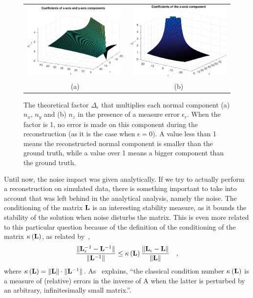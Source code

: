 \documentclass{report}
\begin{document}
\begin{figure}
  \centering
  \begin{tabular}{cc}
  \includegraphics[width=0.45\linewidth]{q3_analytic_nx_ny.pdf} &
  \includegraphics[width=0.45\linewidth]{q3_analytic_nz.pdf} \\
  (a) & (b)
  \end{tabular}
  \caption[Analytical normal component coefficients]
   {The theoretical factor $\Delta_\epsilon$ that multiplies each normal component (a) $n_x$, $n_y$ and (b) $n_z$ in the presence of a measure error $\epsilon_r$. When the factor is 1, no error is made on this component during the reconstruction (as it is the case when $\epsilon = 0$). A value less than 1 means the reconstructed normal component is smaller than the ground truth, while a value over 1 means a bigger component than the ground truth.}
  \label{q3:analytical}
\end{figure}

Until now, the noise impact was given analytically. If we try to actually perform a reconstruction on simulated data, there is something important to take into account that was left behind in the analytical analysis, namely the noise. The conditioning of the matrix $\mathbf{L}$ is an interesting stability measure, as it bounds the stability of the solution when noise disturbs the matrix. This is even more related to this particular question because of the definition of the conditioning of the matrix $\kappa \left(\mathbf{L}\right)$, as related by~\cite{ElGhaoui2002},
\begin{equation}
\frac{ \| \mathbf{L}_\epsilon ^{-1} - \mathbf{L}^{-1} \| }{ \| \mathbf{L}^{-1} \| }
\le \kappa\left(\mathbf{L} \right) \frac{ \| \mathbf{L}_\epsilon - \mathbf{L}  \| }{ \| \mathbf{L} \| }
\quad,
\end{equation}
where $\kappa \left(\mathbf{L}\right) = \|\mathbf{L}\| \cdot \|\mathbf{L}^{-1}\|$. As~\cite{ElGhaoui2002} explains, ``the classical condition number $\kappa \left(\mathbf{L}\right)$ is a measure of (relative) errors in the inverse of A when the latter is perturbed by an arbitrary, infinitesimally small matrix.''.
\end{document}
